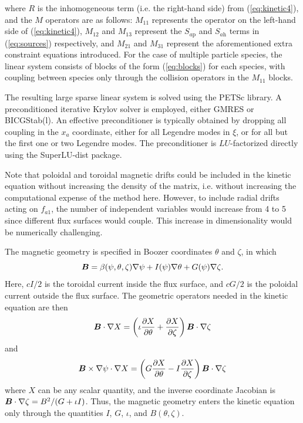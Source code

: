 \documentclass[12pt]{revtex4}
\newcommand{\vect}[1]{\mbox{\boldmath $#1$}}
\newcommand{\Sap}{S_{a\mathrm{p}}}
\newcommand{\Sah}{S_{a\mathrm{h}}}
\begin{document}
where $R$ is the inhomogeneous term (i.e. the right-hand side) from (\ref{eq:kinetic4}),
and the $M$ operators are as follows: $M_{11}$ represents the operator on the left-hand side of (\ref{eq:kinetic4}),
$M_{12}$ and $M_{13}$ represent the $\Sap$ and $\Sah$ terms
in (\ref{eq:sources}) respectively,
and $M_{21}$ and $M_{31}$ represent the aforementioned extra constraint equations introduced.
For the case of multiple particle species, the linear system consists of blocks of the form (\ref{eq:blocks}) for each
species, with coupling between species only through the collision operators in the $M_{11}$ blocks.

The resulting large sparse linear system is solved using the
PETSc\cite{petsc-web-page, petsc-user-ref} library.
A preconditioned iterative Krylov solver is employed,
either GMRES\cite{GMRES} or BICGStab(l)\cite{BICGstabl}.
An effective preconditioner is typically obtained by dropping all coupling in the $x_a$ coordinate,
either for all Legendre modes in $\xi$, or for all but the first one or two Legendre modes.
The preconditioner is $LU$-factorized directly using the SuperLU-dist\cite{superlu1, superlu2} package.

Note that poloidal and toroidal magnetic drifts could be included in the kinetic equation
without increasing the density of the matrix, i.e. without increasing the computational expense
of the method here.  However, to include radial drifts acting on $f_{a1}$,
the number of independent variables would increase from 4 to 5 since different flux surfaces
would couple. This increase in dimensionality would be numerically challenging.

The magnetic geometry is specified in Boozer coordinates $\theta$ and $\zeta$, in which
\begin{equation}
\vect{B} =  \beta(\psi,\theta,\zeta)\nabla\psi + I(\psi)\nabla\theta + G(\psi) \nabla\zeta.
\end{equation}
Here, 
$cI/2$ is the toroidal current inside the flux surface, and $cG/2$ is the poloidal
current outside the flux surface.
The geometric operators needed in the kinetic equation are then
\begin{equation}
\vect{B}\cdot\nabla X = \left( \iota \frac{\partial X}{\partial\theta} + \frac{\partial X}{\partial\zeta}\right)\vect{B}\cdot\nabla\zeta
\end{equation}
and
\begin{equation}
\vect{B}\times\nabla\psi\cdot\nabla X = \left( G \frac{\partial X}{\partial\theta} -I \frac{\partial X}{\partial\zeta}\right)\vect{B}\cdot\nabla\zeta
\end{equation}
where $X$ can be any scalar quantity,
and the inverse coordinate Jacobian is
$\vect{B}\cdot\nabla\zeta = B^2/(G+\iota I)$. Thus, the magnetic geometry
enters the kinetic equation only through the quantities $I$, $G$, $\iota$,
and $B(\theta,\zeta)$.
\end{document}
